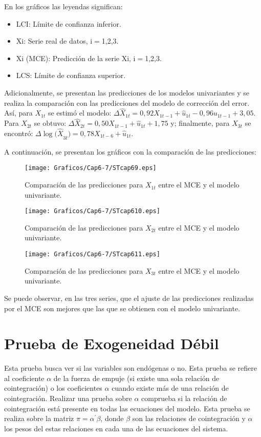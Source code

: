 En los gr\'{a}ficos las leyendas significan:
\begin{itemize}
      \item LCI: L\'{i}mite de confianza inferior.
      \item Xi: Serie real de datos, i$=$1,2,3.
      \item Xi (MCE): Predicci\'{o}n de la serie Xi, i$=$1,2,3.
      \item LCS: L\'{i}mite de confianza superior.
\end{itemize}

Adicionalmente, se presentan las predicciones de los modelos univariantes y se realiza la comparaci\'{o}n con las predicciones del modelo de 
correcci\'{o}n del error. As\'{i}, para $X_{1t}$ se estim\'{o} el modelo: ${\Delta \hat{X}}_{1t}=0,92X_{1t-1}+\hat{u}_{1t}-0,96u_{1t-1}+3,05$. Para 
$X_{2t}$ se obtuvo: ${\Delta \hat{X}}_{2t}=0,50X_{1t-1}+\hat{u}_{1t}+1,75$ y; finalmente, para $X_{3t}$ se encontr\'{o}: ${\Delta \log (\hat{X}}_{3t})=0,78X_{1t-6}+\hat{u}_{1t}$.

A continuaci\'{o}n, se presentan los gr\'{a}ficos con la comparaci\'{o}n de las predicciones:

\begin{figure}[H]
\centering
\texttt{[image: Graficos/Cap6-7/STcap69.eps]}
\caption{Comparaci\'{o}n de las predicciones para $X_{1t}$ entre el MCE y el modelo univariante.}
\end{figure}

\begin{figure}[H]
\centering
\texttt{[image: Graficos/Cap6-7/STcap610.eps]}
\caption{Comparaci\'{o}n de las predicciones para $X_{2t}$ entre el MCE y el modelo univariante.}
\end{figure}

\begin{figure}[H]
\centering
\texttt{[image: Graficos/Cap6-7/STcap611.eps]}
\caption{Comparaci\'{o}n de las predicciones para $X_{3t}$ entre el MCE y el modelo univariante.}
\end{figure}


Se puede observar, en las tres series, que el ajuste de las predicciones realizadas por el MCE son mejores que las que se obtienen con el modelo univariante.

\section{Prueba de Exogeneidad D\'{e}bil}
Esta prueba busca ver si las variables son end\'{o}genas o no. Esta prueba se refiere al coeficiente $\alpha $ de la fuerza de empuje (si existe una sola relaci\'{o}n de cointegraci\'{o}n) o los coeficientes $\alpha $ cuando existe m\'{a}s de una relaci\'{o}n de cointegraci\'{o}n. Realizar una prueba sobre $\alpha $ comprueba si la relaci\'{o}n de cointegraci\'{o}n est\'{a} presente en todas las ecuaciones del modelo. Esta prueba se realiza sobre la matriz $\pi =\alpha^{'}\beta $, donde $\beta $ son las relaciones de cointegraci\'{o}n y $\alpha $ los pesos del estas relaciones en cada una de las ecuaciones del sistema.

